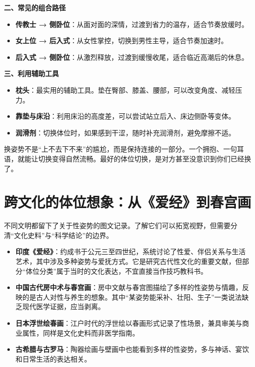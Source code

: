 \documentclass[12pt,UTF8]{ctexbook}
\begin{document}
\textbf{二、常见的组合路径}

\begin{itemize}
\item \textbf{传教士 → 侧卧位}：从面对面的深情，过渡到省力的温存，适合节奏放缓时。
\item \textbf{女上位 → 后入式}：从女性掌控，切换到男性主导，适合节奏加速时。
\item \textbf{后入式 → 侧卧位}：从激烈释放，过渡到缓慢收尾，适合临近高潮后的休息。
\end{itemize}

\textbf{三、利用辅助工具}

\begin{itemize}
\item \textbf{枕头}：最实用的辅助工具。垫在臀部、膝盖、腰部，可以改变角度、减轻压力。
\item \textbf{靠垫与床沿}：利用床沿的高度差，可以尝试站立后入、床边侧卧等变体。
\item \textbf{润滑剂}：切换体位时，如果感到干涩，随时补充润滑剂，避免摩擦不适。
\end{itemize}

\begin{tcolorbox}[colback=pink!5!white,colframe=red!50!black,title=贴心小叮咛]
换姿势不是“上不去下不来”的尴尬，而是保持连接的一部分。一个拥抱、一句耳语，就能让切换变得自然流畅。最好的体位切换，是对方甚至没意识到你们已经换了。
\end{tcolorbox}

\section{跨文化的体位想象：从《爱经》到春宫画}

不同文明都留下了关于性姿势的图文记录。了解它们可以拓宽视野，但需要分清“文化史料”与“科学结论”的边界。

\begin{itemize}
\item \textbf{印度《爱经》}：约成书于公元三至四世纪，系统讨论了性爱、伴侣关系与生活艺术，其中涉及多种姿势与爱抚方式。它是研究古代性文化的重要文献，但部分“体位分类”属于当时的文化表达，不宜直接当作技巧教科书。
\item \textbf{中国古代房中术与春宫画}：房中文献与春宫图描绘了多样的性姿势与情趣，反映的是古人对性与养生的想象。其中“某姿势能采补、壮阳、生子”一类说法缺乏现代医学证据，应当剥离。
\item \textbf{日本浮世绘春画}：江户时代的浮世绘以春画形式记录了性场景，兼具审美与商业属性，同样是文化史料而非医学指南。
\item \textbf{古希腊与古罗马}：陶器绘画与壁画中也能看到多样的性姿势，多与神话、宴饮和日常生活的表达相关。
\end{itemize}
\end{document}
